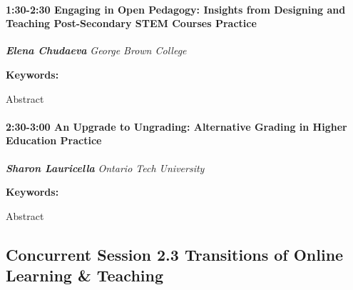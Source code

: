 \documentclass[
]{book}
\begin{document}
\begin{session}
\hypertarget{engaging-in-open-pedagogy-insights-from-designing-and-teaching-post-secondary-stem-courses-practice}{%
\paragraph*{\texorpdfstring{1:30-2:30 \textbar{} \textbf{Engaging in
Open Pedagogy: Insights from Designing and Teaching Post-Secondary STEM
Courses} \textbar{}
Practice}{1:30-2:30 \textbar{} Engaging in Open Pedagogy: Insights from Designing and Teaching Post-Secondary STEM Courses \textbar{} Practice}}\label{engaging-in-open-pedagogy-insights-from-designing-and-teaching-post-secondary-stem-courses-practice}}

\textbf{\emph{Elena Chudaeva}} \textbar{} \emph{George Brown College}

\textbf{Keywords:}

Abstract
\end{session}
\begin{session}
\hypertarget{an-upgrade-to-ungrading-alternative-grading-in-higher-education-practice}{%
\paragraph*{\texorpdfstring{2:30-3:00 \textbar{} \textbf{An Upgrade to
Ungrading: Alternative Grading in Higher Education} \textbar{}
Practice}{2:30-3:00 \textbar{} An Upgrade to Ungrading: Alternative Grading in Higher Education \textbar{} Practice}}\label{an-upgrade-to-ungrading-alternative-grading-in-higher-education-practice}}

\textbf{\emph{Sharon Lauricella}} \textbar{} \emph{Ontario Tech
University}

\textbf{Keywords:}

Abstract
\end{session}

\hypertarget{concurrent-session-2.3-transitions-of-online-learning-teaching}{%
\subsection*{Concurrent Session 2.3 \textbar{} Transitions of Online Learning \& Teaching}\label{concurrent-session-2.3-transitions-of-online-learning-teaching}}
\end{document}
